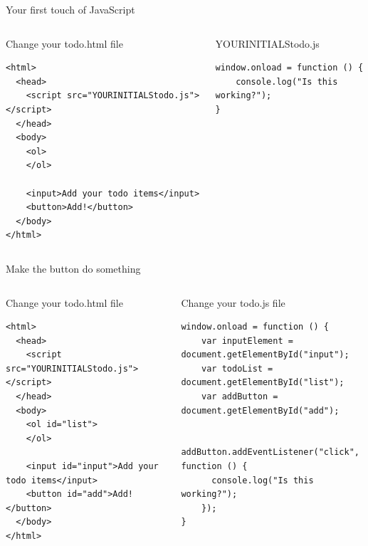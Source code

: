 \documentclass[notes]{beamer}
\begin{document}
\begin{frame}[fragile]{Your first touch of JavaScript}
  \begin{columns}
    \begin{column}{0.45\columnwidth}
      \begin{block}{Change your todo.html file}
        \begin{verbatim}
<html>
  <head>
    <script src="YOURINITIALStodo.js"></script>
  </head>
  <body>
    <ol>
    </ol>

    <input>Add your todo items</input>
    <button>Add!</button>
  </body>
</html>
        \end{verbatim}
      \end{block}
    \end{column}
    \begin{column}{0.45\columnwidth}
      \begin{block}{YOURINITIALStodo.js}
        \begin{verbatim}
window.onload = function () {
    console.log("Is this working?");
}          
        \end{verbatim}
      \end{block}
    \end{column}
  \end{columns}
\end{frame}

\begin{frame}[fragile]{Make the button do something}
  \begin{columns}
    \begin{column}{0.45\columnwidth}
      \begin{block}{Change your todo.html file}
        \begin{verbatim}
<html>
  <head>
    <script src="YOURINITIALStodo.js"></script>
  </head>
  <body>
    <ol id="list">
    </ol>

    <input id="input">Add your todo items</input>
    <button id="add">Add!</button>
  </body>
</html>
        \end{verbatim}
      \end{block}
    \end{column}
    \begin{column}{0.50\columnwidth}
      \begin{block}{Change your todo.js file}
        \begin{verbatim}
window.onload = function () {
    var inputElement = document.getElementById("input");
    var todoList = document.getElementById("list");
    var addButton = document.getElementById("add");

    addButton.addEventListener("click", function () {
      console.log("Is this working?");
    });
}        
        \end{verbatim}
      \end{block}
    \end{column}
  \end{columns}
\end{frame}
\end{document}

